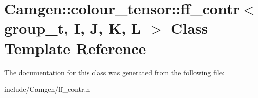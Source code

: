 \hypertarget{a00222}{\section{Camgen\-:\-:colour\-\_\-tensor\-:\-:ff\-\_\-contr$<$ group\-\_\-t, I, J, K, L $>$ Class Template Reference}
\label{a00222}
}


The documentation for this class was generated from the following file\-:\begin{DoxyCompactItemize}
\item 
include/\-Camgen/ff\-\_\-contr.\-h\end{DoxyCompactItemize}
